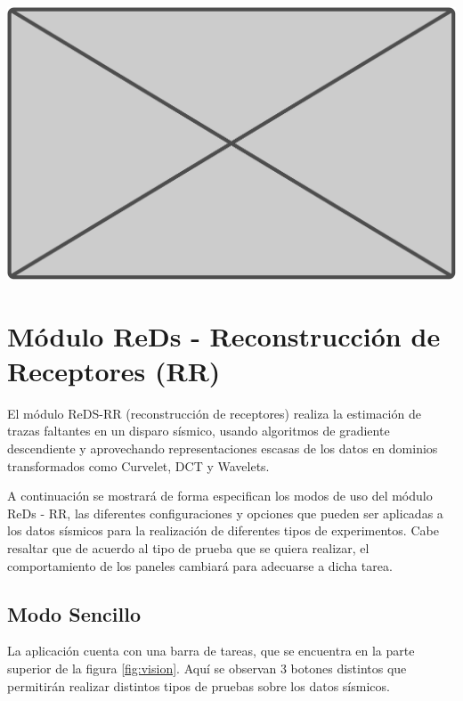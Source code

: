 \documentclass[12pt,twoside,letter]{ol-softwaremanual}
\newcommand*\circled[1]{\tikz[baseline=(char.base)]{
            \node[shape=circle,draw,inner sep=2pt] (char) {#1};}}
\newenvironment{Figure}
  {\par\medskip\noindent\minipage{\linewidth}}
  {\endminipage\par\medskip}
\begin{document}
\begin{Figure}
	\centering
	\includegraphics[width=0.75\linewidth]{figures/blank}
	\label{fig:rd}
\end{Figure}

\newpage
\section{Módulo ReDs - Reconstrucción de Receptores (RR)}

El módulo ReDS-RR (reconstrucción de receptores) realiza la estimación de trazas faltantes en un disparo sísmico, usando algoritmos de gradiente descendiente y aprovechando representaciones escasas de los datos en dominios transformados como Curvelet, DCT y Wavelets.

A continuación se mostrará de forma especifican los modos de uso del módulo ReDs - RR, las diferentes configuraciones y opciones que pueden ser aplicadas a los datos sísmicos para la realización de diferentes tipos de experimentos. Cabe resaltar que de acuerdo al tipo de prueba que se quiera realizar, el comportamiento de los paneles cambiará para adecuarse a dicha tarea.

\subsection{Modo Sencillo}

La aplicación cuenta con una barra de tareas, que se encuentra en la parte superior \circled{1} de la figura \ref{fig:vision}. Aquí se observan 3 botones distintos que permitirán realizar distintos tipos de pruebas sobre los datos sísmicos.
\end{document}
